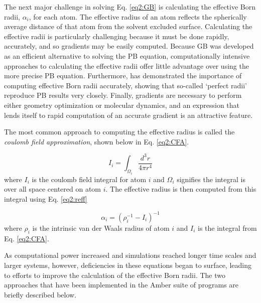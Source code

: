 The next major challenge in solving Eq. \ref{eq2:GB} is calculating the
effective Born radii, $\alpha_i$, for each atom. The effective radius of an atom
reflects the spherically average distance of that atom from the solvent excluded
surface. Calculating the effective radii is particularly challenging because it
must be done rapidly, accurately, and so gradients may be easily computed.
Because GB was developed as an efficient alternative to solving the PB equation,
computationally intensive approaches to calculating the effective radii offer
little advantage over using the more precise PB equation. Furthermore,
\citeauthor{Onufriev_JComputChem_2002_v23_p1297} has demonstrated the importance
of computing effective Born radii accurately,
\cite{Onufriev_JComputChem_2002_v23_p1297} showing that so-called `perfect
radii' reproduce PB results very closely. Finally, gradients are necessary to
perform either geometry optimization or molecular dynamics, and an expression
that lends itself to rapid computation of an accurate gradient is an attractive
feature.

The most common approach to computing the effective radius is called the
\emph{coulomb field approximation}, shown below in Eq. \ref{eq2:CFA}.
\cite{Cramer_Book_EssentialsCompChem_2004}

\begin{equation}
   I _ i = \int _ {\Omega_i} \frac {d^3r} {4 \pi r ^ 4}
   \label{eq2:CFA}
\end{equation}
where $I_i$ is the coulomb field integral for atom $i$ and $\Omega_i$ signifies
the integral is over all space centered on atom $i$. The effective radius is
then computed from this integral using Eq. \ref{eq2:reff}

\begin{equation}
   \alpha _ {i} = \left( \rho _ i ^ {-1} - I _ i \right) ^ {-1}
   \label{eq2:reff}
\end{equation}
where $\rho_i$ is the intrinsic van der Waals radius of atom $i$ and $I_i$ is
the integral from Eq. \ref{eq2:CFA}.

As computational power increased and simulations reached longer time scales and
larger systems, however, deficiencies in these equations began to surface,
leading to efforts to improve the calculation of the effective Born radii.
\cite{Onufriev_JComputChem_2002_v23_p1297, Onufriev_Proteins_2004_v55_p383,
Mongan_JChemTheoryComput_2007_v3_p156, Nguyen_JChemTheoryComput_2013_ASAP} The
two approaches that have been implemented in the Amber suite of programs are
briefly described below.

